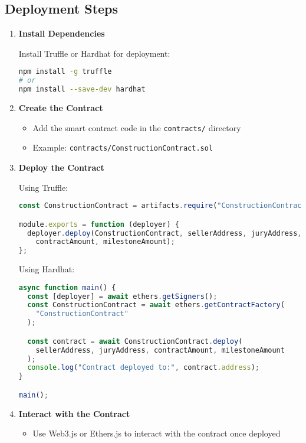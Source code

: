 \documentclass{article}
\begin{document}
\subsection{Deployment Steps}
\begin{enumerate}
    \item \textbf{Install Dependencies}
    
    Install Truffle or Hardhat for deployment:
    \begin{lstlisting}[language=bash]
npm install -g truffle
# or
npm install --save-dev hardhat
    \end{lstlisting}

    \item \textbf{Create the Contract}
    \begin{itemize}
        \item Add the smart contract code in the \texttt{contracts/} directory
        \item Example: \texttt{contracts/ConstructionContract.sol}
    \end{itemize}

    \item \textbf{Deploy the Contract}
    
    Using Truffle:
    \begin{lstlisting}[language=JavaScript]
const ConstructionContract = artifacts.require("ConstructionContract");

module.exports = function (deployer) {
  deployer.deploy(ConstructionContract, sellerAddress, juryAddress, 
    contractAmount, milestoneAmount);
};
    \end{lstlisting}

    Using Hardhat:
    \begin{lstlisting}[language=JavaScript]
async function main() {
  const [deployer] = await ethers.getSigners();
  const ConstructionContract = await ethers.getContractFactory(
    "ConstructionContract"
  );

  const contract = await ConstructionContract.deploy(
    sellerAddress, juryAddress, contractAmount, milestoneAmount
  );
  console.log("Contract deployed to:", contract.address);
}

main();
    \end{lstlisting}

    \item \textbf{Interact with the Contract}
    \begin{itemize}
        \item Use Web3.js or Ethers.js to interact with the contract once deployed
    \end{itemize}
\end{enumerate}
\end{document}
